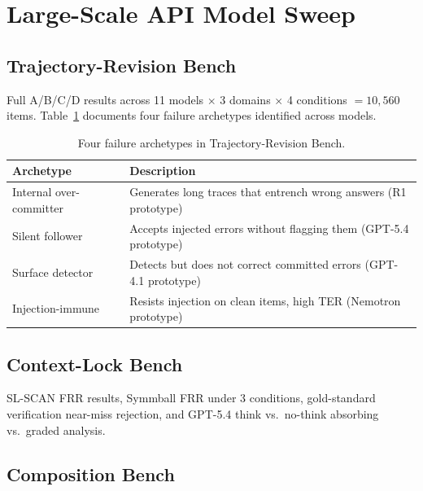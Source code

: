 \documentclass[11pt]{article}
\newcommand{\tighttable}{\setlength{\tabcolsep}{4pt}\renewcommand{\arraystretch}{1.05}}
\begin{document}



\appendix

\section{Large-Scale API Model Sweep}
\label{app:api-sweep}

\subsection{Trajectory-Revision Bench}
\label{app:trb}

Full A/B/C/D results across 11 models $\times$ 3 domains $\times$ 4
conditions $= 10{,}560$ items. Table~\ref{tab:trb-archetypes} documents
four failure archetypes identified across models.

\begin{table}[H]
\centering\small\tighttable
\begin{tabular}{p{3.2cm}p{5.0cm}}
\toprule
\textbf{Archetype} & \textbf{Description} \\
\midrule
Internal over-committer & Generates long traces that entrench wrong answers (R1 prototype) \\
Silent follower & Accepts injected errors without flagging them (GPT-5.4 prototype) \\
Surface detector & Detects but does not correct committed errors (GPT-4.1 prototype) \\
Injection-immune & Resists injection on clean items, high TER (Nemotron prototype) \\
\bottomrule
\end{tabular}
\caption{Four failure archetypes in Trajectory-Revision Bench.}
\label{tab:trb-archetypes}
\end{table}

\subsection{Context-Lock Bench}
\label{app:clb}

SL-SCAN FRR results, Symmball FRR under 3 conditions, gold-standard
verification near-miss rejection, and GPT-5.4 think vs.\ no-think
absorbing vs.\ graded analysis.

\subsection{Composition Bench}
\label{app:cob}
\end{document}
